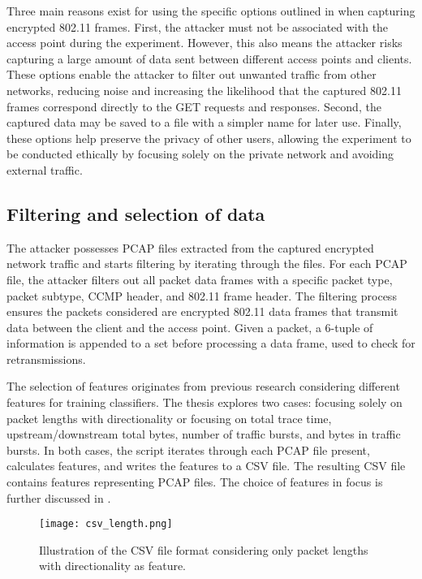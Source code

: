 Three main reasons exist for using the specific options outlined in  when capturing encrypted 802.11 frames. First, the attacker must not be associated with the access point during the experiment. However, this also means the attacker risks capturing a large amount of data sent between different access points and clients. These options enable the attacker to filter out unwanted traffic from other networks, reducing noise and increasing the likelihood that the captured 802.11 frames correspond directly to the GET requests and responses. Second, the captured data may be saved to a file with a simpler name for later use. Finally, these options help preserve the privacy of other users, allowing the experiment to be conducted ethically by focusing solely on the private network and avoiding external traffic.

\subsection{Filtering and selection of data\label{subsec:cleaning-methodology}}

The attacker possesses PCAP files extracted from the captured encrypted network traffic and starts filtering by iterating through the files. For each PCAP file, the attacker filters out all packet data frames with a specific packet type, packet subtype, CCMP header, and 802.11 frame header. The filtering process ensures the packets considered are encrypted 802.11 data frames that transmit data between the client and the access point. Given a packet, a 6-tuple of information is appended to a set before processing a data frame, used to check for retransmissions. 

The selection of features originates from previous research \cite{DBLP:conf/sp/DyerCRS12} considering different features for training classifiers. The thesis explores two cases: focusing solely on packet lengths with directionality or focusing on total trace time, upstream/downstream total bytes, number of traffic bursts, and bytes in traffic bursts. In both cases, the script iterates through each PCAP file present, calculates features, and writes the features to a CSV file. The resulting CSV file contains features representing PCAP files. The choice of features in focus is further discussed in .

\begin{figure}
	\centering
        \texttt{[image: csv\_length.png]}
        \caption{Illustration of the CSV file format considering only packet lengths with directionality as feature.}
    \label{fig:csvlength}
\end{figure}

